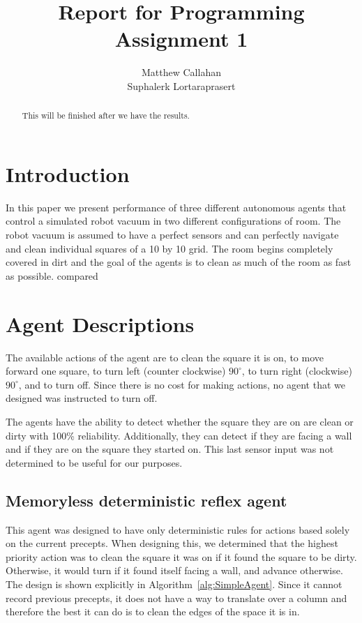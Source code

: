 \documentclass{article}
\title{Report for Programming Assignment 1}
\author{%
  Matthew Callahan\\
  \And
  Suphalerk Lortaraprasert
}
\begin{document}
\maketitle


\begin{abstract}
 This will be finished after we have the results.
\end{abstract}

\section{Introduction}
In this paper we present performance of three different autonomous agents that control a simulated robot vacuum in two different configurations of room. The robot vacuum is assumed to have a perfect sensors and can perfectly navigate and clean individual squares of a 10 by 10 grid. The room begins completely covered in dirt and the goal of the agents is to clean as much of the room as fast as possible.  compared
\section{Agent Descriptions}
The available actions of the agent are to clean the square it is on, to move forward one square, to turn left (counter clockwise) $90^\circ$, to turn right (clockwise) $90^\circ$, and to turn off. Since there is no cost for making actions, no agent that we designed was instructed to turn off.

The agents have the ability to detect whether the square they are on are clean or dirty with 100\% reliability. Additionally, they can detect if they are facing a wall and if they are on the square they started on. This last sensor input was not determined to be useful for our purposes. 
\subsection{Memoryless deterministic reflex agent}
This agent was designed to have only deterministic rules for actions based solely on the current precepts. When designing this, we determined that the highest priority action was to clean the square it was on if it found the square to be dirty. Otherwise, it would turn if it found itself facing a wall, and advance otherwise. The design is shown explicitly in Algorithm~\ref{alg:SimpleAgent}. Since it cannot record previous precepts, it does not have a way to translate over a column and therefore the best it can do is to clean the edges of the space it is in.
\end{document}
